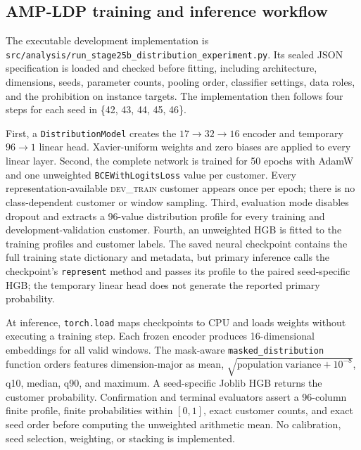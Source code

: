 \subsection{AMP-LDP training and inference workflow}

The executable development implementation is \texttt{src/analysis/run\_stage25b\_distribution\_experiment.py}. Its sealed JSON specification is loaded and checked before fitting, including architecture, dimensions, seeds, parameter counts, pooling order, classifier settings, data roles, and the prohibition on instance targets. The implementation then follows four steps for each seed in \{42, 43, 44, 45, 46\}.

First, a \texttt{DistributionModel} creates the $17\rightarrow32\rightarrow16$ encoder and temporary $96\rightarrow1$ linear head. Xavier-uniform weights and zero biases are applied to every linear layer. Second, the complete network is trained for 50 epochs with AdamW and one unweighted \texttt{BCEWithLogitsLoss} value per customer. Every representation-available \textsc{dev\_train} customer appears once per epoch; there is no class-dependent customer or window sampling. Third, evaluation mode disables dropout and extracts a 96-value distribution profile for every training and development-validation customer. Fourth, an unweighted HGB is fitted to the training profiles and customer labels. The saved neural checkpoint contains the full training state dictionary and metadata, but primary inference calls the checkpoint's \texttt{represent} method and passes its profile to the paired seed-specific HGB; the temporary linear head does not generate the reported primary probability.

At inference, \texttt{torch.load} maps checkpoints to CPU and loads weights without executing a training step. Each frozen encoder produces 16-dimensional embeddings for all valid windows. The mask-aware \texttt{masked\_distribution} function orders features dimension-major as mean, $\sqrt{\mathrm{population\ variance}+10^{-8}}$, q10, median, q90, and maximum. A seed-specific Joblib HGB returns the customer probability. Confirmation and terminal evaluators assert a 96-column finite profile, finite probabilities within $[0,1]$, exact customer counts, and exact seed order before computing the unweighted arithmetic mean. No calibration, seed selection, weighting, or stacking is implemented.

